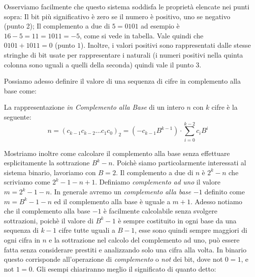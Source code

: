 Osserviamo facilmente che questo sistema soddisfa le proprietà elencate nei
punti sopra: Il bit più significativo è zero se il numero è
positivo, uno se negativo (punto 2); Il complemento a due di $5 = 0101$ ad
esempio è $16-5 = 11 = 1011 = -5$, come si vede in tabella. Vale quindi che
$0101+1011 = 0$ (punto $1$). Inoltre, i valori positivi sono rappresentati dalle stesse stringhe di bit usate per rappresentare i naturali (i numeri positivi nella quinta colonna sono uguali a quelli della seconda)
quindi vale il punto $3$.

Possiamo adesso definire il valore di una sequenza di cifre in complemento alla base come:

\begin{defn}
La rappresentazione \emph{in Complemento alla Base} di un intero $n$ 
con $k$ cifre è la seguente:
	\[ n = (c_{k-1}c_{k-2}{\ldots}c_1c_0)_2 = (-c_{k-1}B^{k-1}) \cdot \sum_{i=0}^{k-2}c_iB^i \]
\end{defn}

Mostriamo inoltre come calcolare il complemento alla base senza effettuare
esplicitamente la sottrazione $B^k - n$. Poichè siamo particolarmente
interessati al sistema binario, lavoriamo con $B=2$.  
Il complemento a due di $n$ è $2^k - n$ che scriviamo come $2^k-1-n+1$. Definiamo \emph{complemento ad uno} il valore $m = 2^k-1-n$. In generale avremo un \emph{complemento alla base $-1$} definito come $m = B^k-1-n$ ed il complemento alla base è uguale a $m+1$. 
Adesso notiamo che il complemento alla base $-1$ è facilmente calcolabile
senza svolgere sottrazioni, poichè il valore di $B^k-1$ è sempre costituito in ogni base da una sequenza di $k-1$ cifre tutte uguali a $B-1$, esse sono quindi sempre maggiori di ogni cifra in $n$ e la sottrazione nel calcolo del complemento ad uno, può essere fatta senza considerare prestiti e analizzando solo una cifra alla volta. In binario questo corrisponde all'operazione di \emph{complemento} o \emph{not} dei bit, dove \textsf{not} $0 = 1$, e \textsf{not} $1 = 0$. Gli
esempi chiariranno meglio il significato di quanto detto:

